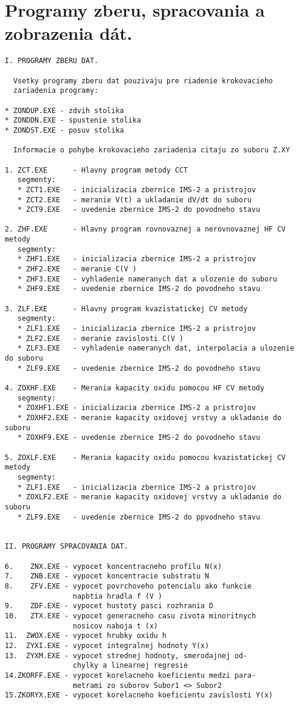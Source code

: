 
\chapter{Programy zberu, spracovania a zobrazenia dát.}\label{app:AppendixH}

\begin{verbatim}
I. PROGRAMY ZBERU DAT.

  Vsetky programy zberu dat pouzivaju pre riadenie krokovacieho
  zariadenia programy:

* ZONDUP.EXE - zdvih stolika
* ZONDDN.EXE - spustenie stolika
* ZONDST.EXE - posuv stolika

  Informacie o pohybe krokovacieho zariadenia citaju zo suboru Z.XY

1. ZCT.EXE      - Hlavny program metody CCT
   segmenty:
   * ZCT1.EXE   - inicializacia zbernice IMS-2 a pristrojov
   * ZCT2.EXE   - meranie V(t) a ukladanie dV/dt do suboru
   * ZCT9.EXE   - uvedenie zbernice IMS-2 do povodneho stavu

2. ZHF.EXE      - Hlavny program rovnovaznej a nerovnovaznej HF CV metody
   segmenty:
   * ZHF1.EXE   - inicializacia zbernice IMS-2 a pristrojov
   * ZHF2.EXE   - meranie C(V )
   * ZHF3.EXE   - vyhladenie nameranych dat a ulozenie do suboru
   * ZHF9.EXE   - uvedenie zbernice IMS-2 do povodneho stavu

3. ZLF.EXE      - Hlavny program kvazistatickej CV metody
   segmenty:
   * ZLF1.EXE   - inicializacia zbernice IMS-2 a pristrojov
   * ZLF2.EXE   - meranie zavislosti C(V )
   * ZLF3.EXE   - vyhladenie nameranych dat, interpolacia a ulozenie do suboru
   * ZLF9.EXE   - uvedenie zbernice IMS-2 do povodneho stavu

4. ZOXHF.EXE    - Merania kapacity oxidu pomocou HF CV metody
   segmenty:
   * ZOXHF1.EXE - inicializacia zbernice IMS-2 a pristrojov
   * ZOXHF2.EXE - meranie kapacity oxidovej vrstvy a ukladanie do suboru
   * ZOXHF9.EXE - uvedenie zbernice IMS-2 do povodneho stavu

5. ZOXLF.EXE    - Merania kapacity oxidu pomocou kvazistatickej CV metody
   segmenty:
   * ZLF1.EXE   - inicializacia zbernice IMS-2 a pristrojov
   * ZOXLF2.EXE - meranie kapacity oxidovej vrstvy a ukladanie do suboru
   * ZLF9.EXE   - uvedenie zbernice IMS-2 do ppvodneho stavu


II. PROGRAMY SPRACOVANIA DAT.

6.    ZNX.EXE - vypocet koncentracneho profilu N(x)
7.    ZNB.EXE - vypocet koncentracie substratu N
8.    ZFV.EXE - vypocet povrchoveho potencialu ako funkcie 
                napbtia hradla f (V )
9.    ZDF.EXE - vypocet hustoty pasci rozhrania D
10.   ZTX.EXE - vypocet generacneho casu zivota minoritnych 
                nosicov naboja t (x)
11.  ZWOX.EXE - vypocet hrubky oxidu h
12.  ZYXI.EXE - vypocet integralnej hodnoty Y(x)
13.  ZYXM.EXE - vypocet strednej hodnoty, smerodajnej od-
                chylky a linearnej regresie
14.ZKORFF.EXE - vypocet korelacneho koeficientu medzi para-
                metrami zo suborov Subor1 <> Subor2
15.ZKORYX.EXE - vypocet korelacneho koeficientu zavislosti Y(x)



\end{verbatim}

